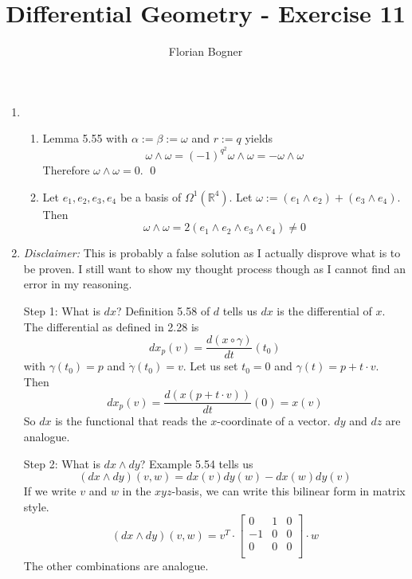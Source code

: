 \documentclass[a4paper,11pt,notitlepage,fullpage]{article}
\begin{document}
\author{Florian Bogner}
\title{Differential Geometry - Exercise 11}
\maketitle


\begin{enumerate}
\item
\begin{enumerate}
\item Lemma 5.55 with $\alpha := \beta := \omega$ and $r := q$ yields
\begin{equation*}
\omega \wedge \omega = (-1)^{q^2} \omega \wedge \omega = -\omega \wedge \omega
\end{equation*}
Therefore $\omega \wedge \omega = 0$. \qed
\item Let $e_1, e_2, e_3, e_4$ be a basis of $\Omega^1(\mathbb R^4)$. Let $\omega := (e_1 \wedge e_2)+(e_3 \wedge e_4)$. Then
\begin{equation*}
\omega \wedge \omega = 2 (e_1 \wedge e_2 \wedge e_3 \wedge e_4) \neq 0
\end{equation*}
\end{enumerate}

\item \emph{Disclaimer:} This is probably a false solution as I actually disprove what is to be proven. I still want to show my thought process though as I cannot find an error in my reasoning.

Step 1: What is $dx$? Definition 5.58 of $d$ tells us $dx$ is the differential of $x$. The differential as defined in 2.28 is
\begin{equation*}
dx_p(v) = \frac{d(x\circ \gamma)}{dt}(t_0)
\end{equation*}
with $\gamma(t_0) = p$ and $\dot\gamma(t_0) = v$. Let us set $t_0 = 0$ and $\gamma(t) = p + t\cdot v$. Then 
\begin{equation*}
dx_p(v) = \frac{d(x(p + t\cdot v))}{dt}(0) = x(v)
\end{equation*}
So $dx$ is the functional that reads the $x$-coordinate of a vector. $dy$ and $dz$ are analogue.

Step 2: What is $dx \wedge dy$? Example 5.54 tells us
\begin{equation*}
(dx \wedge dy)(v, w) = dx(v)dy(w) - dx(w)dy(v)
\end{equation*}
If we write $v$ and $w$ in the $xyz$-basis, we can write this bilinear form in matrix style.
\begin{equation*}
(dx \wedge dy)(v, w) = v^T \cdot
\left[ {\begin{array}{rrr}
   0 & 1 & 0 \\
  -1 & 0 & 0 \\
   0 & 0 & 0 \\
\end{array} } \right] \cdot w
\end{equation*}
The other combinations are analogue.


\end{enumerate}
\end{document}
